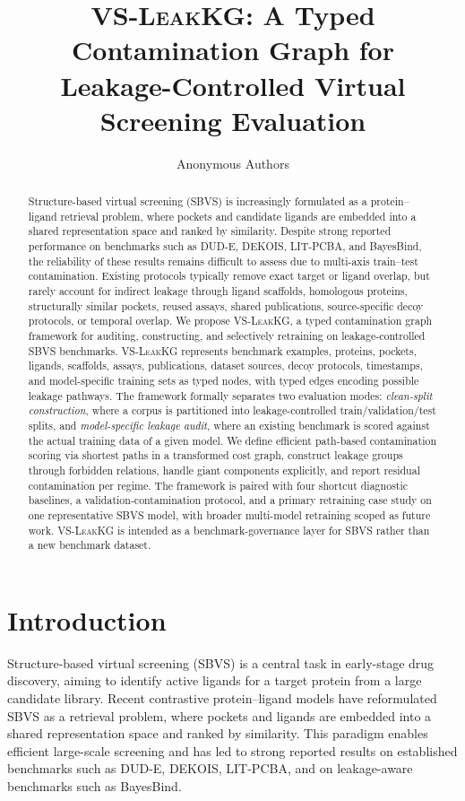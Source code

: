 \documentclass[11pt]{article}
\title{\textsc{VS-LeakKG}: A Typed Contamination Graph for\\
Leakage-Controlled Virtual Screening Evaluation}
\author{Anonymous Authors}
\date{}
\begin{document}
\maketitle

\begin{abstract}
Structure-based virtual screening (SBVS) is increasingly formulated as a protein--ligand retrieval problem, where pockets and candidate ligands are embedded into a shared representation space and ranked by similarity. Despite strong reported performance on benchmarks such as DUD-E, DEKOIS, LIT-PCBA, and BayesBind, the reliability of these results remains difficult to assess due to multi-axis train--test contamination. Existing protocols typically remove exact target or ligand overlap, but rarely account for indirect leakage through ligand scaffolds, homologous proteins, structurally similar pockets, reused assays, shared publications, source-specific decoy protocols, or temporal overlap. We propose \textsc{VS-LeakKG}, a typed contamination graph framework for auditing, constructing, and selectively retraining on leakage-controlled SBVS benchmarks. \textsc{VS-LeakKG} represents benchmark examples, proteins, pockets, ligands, scaffolds, assays, publications, dataset sources, decoy protocols, timestamps, and model-specific training sets as typed nodes, with typed edges encoding possible leakage pathways. The framework formally separates two evaluation modes: \emph{clean-split construction}, where a corpus is partitioned into leakage-controlled train/validation/test splits, and \emph{model-specific leakage audit}, where an existing benchmark is scored against the actual training data of a given model. We define efficient path-based contamination scoring via shortest paths in a transformed cost graph, construct leakage groups through forbidden relations, handle giant components explicitly, and report residual contamination per regime. The framework is paired with four shortcut diagnostic baselines, a validation-contamination protocol, and a primary retraining case study on one representative SBVS model, with broader multi-model retraining scoped as future work. \textsc{VS-LeakKG} is intended as a benchmark-governance layer for SBVS rather than a new benchmark dataset.
\end{abstract}

\section{Introduction}

Structure-based virtual screening (SBVS) is a central task in early-stage drug discovery, aiming to identify active ligands for a target protein from a large candidate library. Recent contrastive protein--ligand models have reformulated SBVS as a retrieval problem, where pockets and ligands are embedded into a shared representation space and ranked by similarity. This paradigm enables efficient large-scale screening and has led to strong reported results on established benchmarks such as DUD-E, DEKOIS, LIT-PCBA, and on leakage-aware benchmarks such as BayesBind.
\end{document}
